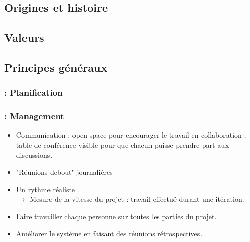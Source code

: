 \begin{frame}
\tableofcontents

\end{frame}
    
\subsection{Origines et histoire}
\begin{frame}
\frametitle{\insertsubsection}
\end{frame}

\subsection{Valeurs}
\begin{frame}
\frametitle{\insertsubsection}
\end{frame}

\subsection{Principes généraux}
\begin{frame}
\frametitle{\insertsubsection : Planification}

\end{frame}

\begin{frame}
\frametitle{\insertsubsection : Management}
\begin{itemize}
\item Communication : open space pour encourager le travail en collaboration ; table de conférence visible pour que chacun puisse prendre part aux discussions.

\item "Réunions debout" journalières\\ 

\item Un rythme réaliste \\
$\longrightarrow$ Mesure de la vitesse du projet : travail effectué durant une itération.

\item Faire travailler chaque personne sur toutes les parties du projet.

\item Améliorer le système en faisant des réunions rétrospectives.

\end{itemize}

\end{frame}

